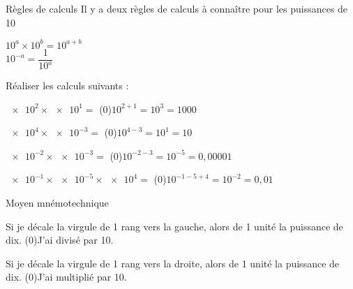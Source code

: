 \pasCorrection{\vspace*{-18pt}}
\begin{doc}{Règles de calculs}
  Il y a deux règles de calculs à connaître pour les puissances de 10
  \begin{importants}
    \pointCyan $10^a \times 10^b = 10^{a + b}$ \\   
    \pointCyan $10^{-a} = \dfrac{1}{10^a}$
  \end{importants}
\end{doc}


\numeroQuestion Réaliser les calculs suivants :
\pasCorrection{\vspace*{-4pt}}
\begin{listePoints}[2]
  \setlength\itemsep{-4pt}
  \item $\num{e2} \times \num{e1}  =$ \texteTrou(0){$10^{2 + 1} = 10^3 = 1000$}
  \item $\num{e4} \times \num{e-3} =$ \texteTrou(0){$10^{4 - 3} = 10^1 = 10$}
  \item $\num{e-2}\times \num{e-3} =$ \texteTrou(0){$10^{-2 -3} = 10^{-5} = 0,00001$}
  \item $\num{e-1}\times \num{e-5}\times \num{e4}=$ \texteTrou(0){$10^{-1 -5 +4} = 10^{-2} = 0,01$}
\end{listePoints}


\pasCorrection{\vspace*{-18pt}}
\begin{doc}{Moyen mnémotechnique}
  \vspace*{-8pt}
  \begin{listePoints}
    \setlength\itemsep{-8pt}
    \item Si je décale la virgule de 1 rang vers la gauche, alors
     de 1 unité la puissance de dix. \texteTrou(0){J'ai divisé par 10.}
    \item Si je décale la virgule de 1 rang vers la droite, alors
     de 1 unité la puissance de dix. \texteTrou(0){J'ai multiplié par 10.}
  \end{listePoints}
\end{doc}


\newpage
\vspace*{-36pt}

